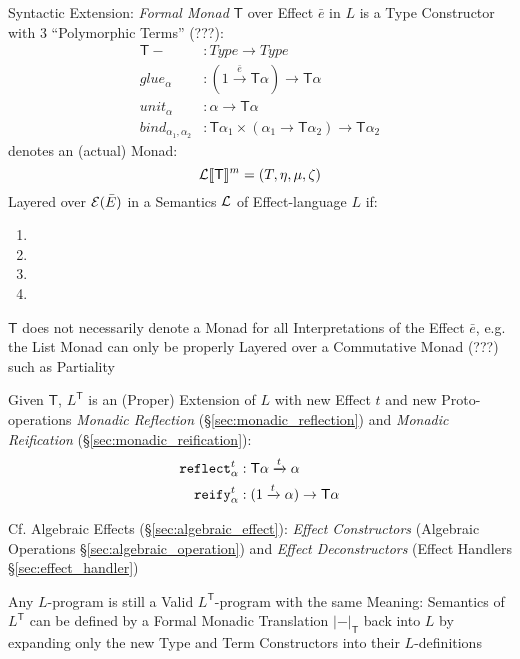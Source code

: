 Syntactic Extension: \emph{Formal Monad} $\mathsf{T}$ over Effect
$\bar{e}$ in $L$ is a Type Constructor with 3 ``Polymorphic Terms''
(???):
\begin{align*}
  \mathsf{T} - &: Type \rightarrow Type \\
  glue_\alpha &: (1 \xrightarrow{\bar{e}} \mathsf{T} \alpha)
    \rightarrow \mathsf{T} \alpha \\
  unit_\alpha &: \alpha \rightarrow \mathsf{T} \alpha \\
  bind_{\alpha_1,\alpha_2} &: \mathsf{T} \alpha_1 \times (\alpha_1
    \rightarrow \mathsf{T} \alpha_2) \rightarrow \mathsf{T} \alpha_2
\end{align*}
denotes an (actual) Monad:
\[
  \mathcal{L}\llbracket \mathsf{T} \rrbracket^m = (T,\eta,\mu,\zeta)
\]
Layered over $\mathcal{E}(\bar{E})$ in a Semantics $\mathcal{L}$ of
Effect-language $L$ if: %
\begin{enumerate}
  \item
  \item
  \item
  \item
\end{enumerate}

\fist $\mathsf{T}$ does not necessarily denote a Monad for all
Interpretations of the Effect $\bar{e}$, e.g. the List Monad can only
be properly Layered over a Commutative Monad (???) such as Partiality

Given $\mathsf{T}$, $L^\mathsf{T}$ is an (Proper) Extension of $L$
with new Effect $t$ and new Proto-operations \emph{Monadic Reflection}
(\S\ref{sec:monadic_reflection}) and \emph{Monadic Reification}
(\S\ref{sec:monadic_reification}):
\begin{align*}
  \mathtt{reflect}_\alpha^t &: \mathsf{T} \alpha \xrightarrow{t} \alpha \\
  \mathtt{reify}_\alpha^t &: (1 \xrightarrow{t} \alpha) \rightarrow
    \mathsf{T} \alpha
\end{align*}

\fist Cf. Algebraic Effects (\S\ref{sec:algebraic_effect}):
\emph{Effect Constructors} (Algebraic Operations
\S\ref{sec:algebraic_operation}) and \emph{Effect Deconstructors}
(Effect Handlers \S\ref{sec:effect_handler})

Any $L$-program is still a Valid $L^\mathsf{T}$-program with the same
Meaning: Semantics of $L^\mathsf{T}$ can be defined by a Formal
Monadic Translation $|-|_\mathsf{T}$ back into $L$ by expanding only
the new Type and Term Constructors into their $L$-definitions

